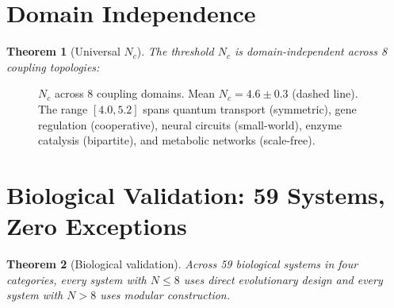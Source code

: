 \documentclass[11pt]{amsart}
\newtheorem{theorem}{Theorem}[section]
\theoremstyle{definition}
\begin{document}
\section{Domain Independence}
\label{sec:domains}

\begin{theorem}[Universal $N_c$]\label{thm:universal}
The threshold $N_c$ is domain-independent across 8 coupling topologies:
\end{theorem}

\begin{figure}[ht]
\centering
{}
\caption{$N_c$ across 8 coupling domains. Mean $N_c = 4.6 \pm 0.3$ (dashed line). The range $[4.0, 5.2]$ spans quantum transport (symmetric), gene regulation (cooperative), neural circuits (small-world), enzyme catalysis (bipartite), and metabolic networks (scale-free).}
\label{fig:domains}
\end{figure}


\section{Biological Validation: 59 Systems, Zero Exceptions}
\label{sec:biology}

\begin{theorem}[Biological validation]\label{thm:bio}
Across 59 biological systems in four categories, every system with $N \leq 8$ uses direct evolutionary design and every system with $N > 8$ uses modular construction.
\end{theorem}
\end{document}
